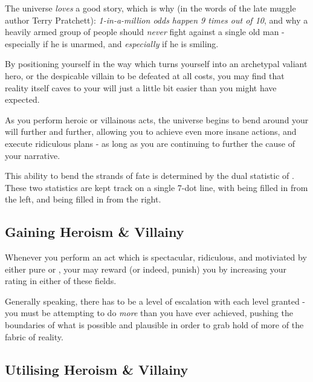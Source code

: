 The universe {\it loves} a good story, which is why (in the words of the late muggle author Terry Pratchett): {\it 1-in-a-million odds happen 9 times out of 10}, and why a heavily armed group of people should {\it never} fight against a single old man - especially if he is unarmed, and {\it especially} if he is smiling. 

By positioning yourself in the way which turns yourself into an archetypal valiant hero, or the despicable villain to be defeated at all costs, you may find that reality itself caves to your will just a little bit easier than you might have expected. 

As you perform heroic or villainous acts, the universe begins to bend around your will further and further, allowing you to achieve even more insane actions, and execute ridiculous plans - as long as you are continuing to further the cause of your narrative. 

This ability to bend the strands of fate is determined by the dual statistic of . These two statistics are kept track on a single 7-dot line, with  being filled in from the left, and  being filled in from the right. 

\subsection{Gaining Heroism \& Villainy}

Whenever you perform an act which is spectacular, ridiculous, and motiviated by either pure  or , your  may reward (or indeed, punish) you by increasing your rating in either of these fields. 

Generally speaking, there has to be a level of escalation with each level granted - you must be attempting to do {\it more} than you have ever achieved, pushing the boundaries of what is possible and plausible in order to grab hold of more of the fabric of reality. 

\subsection{Utilising Heroism \& Villainy}


